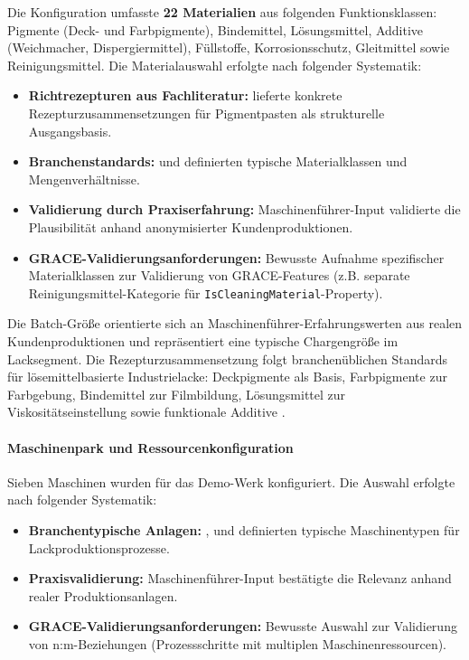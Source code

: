 Die Konfiguration umfasste \textbf{22 Materialien} aus folgenden Funktionsklassen: Pigmente (Deck- und Farbpigmente), Bindemittel, Lösungsmittel, Additive (Weichmacher, Dispergiermittel), Füllstoffe, Korrosionsschutz, Gleitmittel sowie Reinigungsmittel. Die Materialauswahl erfolgte nach folgender Systematik:

\begin{itemize}
    \item \textbf{Richtrezepturen aus Fachliteratur:} \cite{mueller:lackformulierung2017} lieferte konkrete Rezepturzusammensetzungen für Pigmentpasten als strukturelle Ausgangsbasis.
    \item \textbf{Branchenstandards:} \cite{vci:lacke_farben2018} und \cite{basf:lackiertechnik2019} definierten typische Materialklassen und Mengenverhältnisse.
    \item \textbf{Validierung durch Praxiserfahrung:} Maschinenführer-Input validierte die Plausibilität anhand anonymisierter Kundenproduktionen.
    \item \textbf{GRACE-Validierungsanforderungen:} Bewusste Aufnahme spezifischer Materialklassen zur Validierung von GRACE-Features (z.B. separate Reinigungsmittel-Kategorie für \texttt{IsCleaningMaterial}-Property).
\end{itemize}

Die Batch-Größe orientierte sich an Maschinenführer-Erfahrungswerten aus realen Kundenproduktionen und repräsentiert eine typische Chargengröße im Lacksegment. Die Rezepturzusammensetzung folgt branchenüblichen Standards für lösemittelbasierte Industrielacke: Deckpigmente als Basis, Farbpigmente zur Farbgebung, Bindemittel zur Filmbildung, Lösungsmittel zur Viskositätseinstellung sowie funktionale Additive \citep{vci:lacke_farben2018, mueller:lackformulierung2017}.

\paragraph{Maschinenpark und Ressourcenkonfiguration}

Sieben Maschinen wurden für das Demo-Werk konfiguriert. Die Auswahl erfolgte nach folgender Systematik:

\begin{itemize}
    \item \textbf{Branchentypische Anlagen:} \cite{vci:lacke_farben2018}, \cite{brock:lacktechnologie2020} und \cite{basf:lackiertechnik2019} definierten typische Maschinentypen für Lackproduktionsprozesse.
    \item \textbf{Praxisvalidierung:} Maschinenführer-Input bestätigte die Relevanz anhand realer Produktionsanlagen.
    \item \textbf{GRACE-Validierungsanforderungen:} Bewusste Auswahl zur Validierung von n:m-Beziehungen (Prozessschritte mit multiplen Maschinenressourcen).
\end{itemize}

